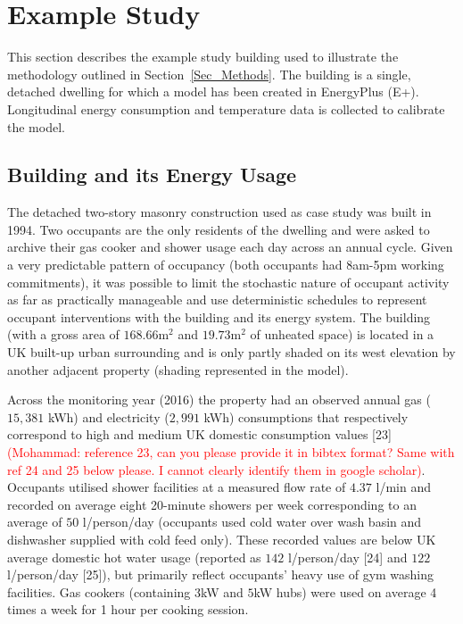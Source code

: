 \documentclass[preprint,12pt, sort&compress]{elsarticle}
\begin{document}

\section{Example Study}
\label{Sec_Example}

This section describes the example study building used to illustrate the methodology outlined in Section~\ref{Sec_Methods}. The building is a single, detached dwelling for which a model has been created in EnergyPlus (E+). Longitudinal energy consumption and temperature data is collected to calibrate the model. 


\subsection{Building and its Energy Usage}
The detached two-story masonry construction used as case study was built in 1994. Two occupants are the only residents of the dwelling and were asked to archive their gas cooker and shower usage each day across an annual cycle. Given a very predictable pattern of occupancy (both occupants had 8am-5pm working commitments), it was possible to limit the stochastic nature of occupant activity as far as practically manageable and use deterministic schedules to represent occupant interventions with the building and its energy system. The building (with a gross area of $168.66$m$^2$ and $19.73$m$^2$ of unheated space) is located in a UK built-up urban surrounding and is only partly shaded on its west elevation by another adjacent property (shading represented in the model).

Across the monitoring year (2016) the property had an observed annual gas ($15,381$ kWh) and electricity ($2,991$ kWh) consumptions that respectively correspond to high and medium UK domestic consumption values [23] \textcolor{red}{(Mohammad: reference 23, can you please provide it in bibtex format? Same with ref 24 and 25 below please. I cannot clearly identify them in google scholar)}. Occupants utilised shower facilities at a measured flow rate of $4.37$ l/min and recorded on average eight 20-minute showers per week corresponding to an average of $50$ l/person/day (occupants used cold water over wash basin and dishwasher supplied with cold feed only). These recorded values are below UK average domestic hot water usage (reported as $142$ l/person/day [24] and $122$ l/person/day [25]), but primarily reflect occupants’ heavy use of gym washing facilities. Gas cookers (containing $3$kW and $5$kW hubs) were used on average 4 times a week for 1 hour per cooking session. 
\end{document}
